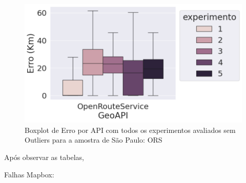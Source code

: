 \begin{figure}[h]
    \centering
    \includegraphics[width=\textwidth]{Figuras/boxplotApiOrsSemOutSP.png}
    \caption{Boxplot de Erro por API com todos os experimentos avaliados sem Outliers para a amostra de São Paulo: ORS}
    \label{fig:boxplot-api-ors-semout-sp}
\end{figure}

Após observar as tabelas, 
  
Falhas Mapbox:

